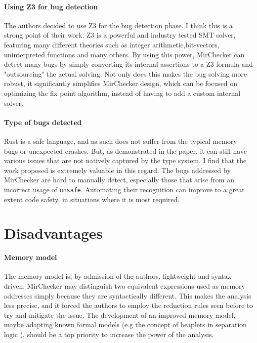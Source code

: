 \documentclass{article}
\begin{document}
 \paragraph{Using Z3 for bug detection} The authors decided to use Z3 for the bug detection phase. I think this is a 
 strong point of their work. Z3 is a powerful and industry tested SMT solver, featuring many different theories such as integer 
 arithmetic,bit-vectors, uninterpreted functions and many others. By using this power, MirChecker can detect many bugs by simply 
 converting its internal assertions to a Z3 formula and "outsourcing" the actual solving. Not only does this makes the bug solving more robust, 
 it significantly simplifies MirChecker design, which can be focused on optimizing the fix point algorithm, instead of having to add a custom internal solver.

 \paragraph{Type of bugs detected} Rust is a safe language, and as such does not suffer from the typical memory bugs or unexpected crashes. But, as demonstrated in the paper, 
 it can still have various issues that are not natively captured by the type system. I find that the work proposed is extremely valuable in this regard. The bugs addressed by MirChecker
 are hard to manually detect, especially those that arise from an incorrect usage of \texttt{unsafe}. Automating their recognition can improve to a great extent code safety, in situations 
 where it is most required.
\section{Disadvantages}

\paragraph{Memory model}
The memory model is, by admission of the authors, lightweight and syntax driven. MirChecker may distinguish 
two  equivalent expressions used as memory addresses simply because they are syntactically different. This makes the analysis 
less precise, and it forced the authors to employ the reduction rules seen before to try and mitigate the issue. The development of an improved
memory model, maybe adapting known formal models  (e.g the concept of heaplets in separation logic \cite{o2019separation}), should be a top priority to  
increase the power of the analysis.
\end{document}

